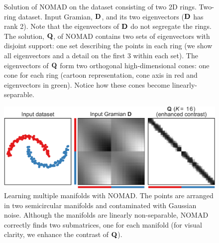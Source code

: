 \documentclass[twoside,11pt]{article}
\begin{document}
\begin{figure}[t]
	\caption{Solution of NOMAD on the dataset consisting of two 2D rings.
    \protect{} Two-ring dataset.
    \protect{} Input Gramian, ${\mathbf{D}}$, and its two eigenvectors (${\mathbf{D}}$ has rank 2). Note that the eigenvectors of  ${\mathbf{D}}$ do not segregate the rings.
	\protect{} The solution, ${\mathbf{Q}}$, of NOMAD contains two sets of eigenvectors with disjoint support: one set describing the points in each ring (we show all eigenvectors and a detail on the first 3 within each set).
	\protect{} The eigenvectors of ${\mathbf{Q}}$ form two orthogonal high-dimensional cones: one cone for each ring (cartoon representation, cone axis in red and eigenvectors in green). Notice how these cones become linearly-separable.}
	\label{fig:circles_eigendecomposition}
\end{figure}

\begin{figure}[p]
	\centering
	\includegraphics[width=.45\linewidth]{clustering/moons}
	
	\caption{Learning multiple manifolds with NOMAD. The points are arranged in two semicircular manifolds and contaminated with Gaussian noise. Although the manifolds are linearly non-separable, NOMAD correctly finds two submatrices, one for each manifold (for visual clarity, we enhance the contrast of ${\mathbf{Q}}$).}
	\label{fig:moons}
\end{figure}
\end{document}

